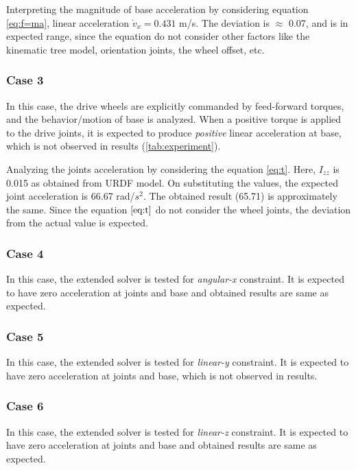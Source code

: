 Interpreting the magnitude of base acceleration by considering equation \ref{eq:f=ma},
linear acceleration $\dot{v}_x = 0.431$ m/s. The deviation is $\approx$ 0.07, and is in expected range, since the equation do not consider other factors like the kinematic tree model, orientation joints, the wheel offset, etc. 

\subsubsection*{Case 3}
\hspace{20pt}In this case, the drive wheels are explicitly commanded by feed-forward torques, and the behavior/motion of base is analyzed. 
When a positive torque is applied to the drive joints, it is expected to produce \textit{positive} linear acceleration at base, which is not observed in results (\ref{tab:experiment}). 

Analyzing the joints acceleration by considering the equation \ref{eq:t}. Here, $I_{zz}$ is 0.015 as obtained from URDF model. On substituting the values, the expected joint acceleration is 66.67 rad/$s^2$. The obtained result (65.71) is approximately the same. Since the equation $\ref{eq:t}$ do not consider the wheel joints, the deviation from the actual value is expected.

\subsubsection*{Case 4}
\hspace{20pt}In this case, the extended solver is tested for \textit{angular-x} constraint. It is expected to have zero acceleration at joints and base and obtained results are same as expected.

\subsubsection*{Case 5}
\hspace{20pt}In this case, the extended solver is tested for \textit{linear-y} constraint. It is expected to have zero acceleration at joints and base, which is not observed in results.

\subsubsection*{Case 6}
\hspace{20pt}In this case, the extended solver is tested for \textit{linear-z} constraint. It is expected to have zero acceleration at joints and base and obtained results are same as expected.

